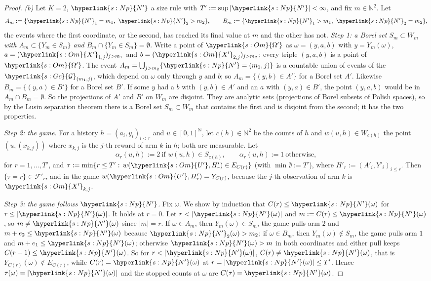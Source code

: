 \documentclass[11pt]{article}
\newcommand{\sy}[2]{\hyperlink{#1}{#2}}
\newcommand{\N}{\mathbb{N}}
\newcommand{\Gc}{\sy{s:Gc}{\mathcal{G}}}
\newcommand{\Np}{\sy{s:Np}{N'}}
\newcommand{\Om}{\sy{s:Om}{\Omega'}}
\newcommand{\Up}{\sy{s:Om}{U'}}
\newcommand{\Xp}{\sy{s:Om}{X'}}
\begin{document}
\begin{proof}
\emph{(b)} Let $K=2$, $\Np$ a size rule with $T':=\sup|\Np|<\infty$, and fix $m\in\N^2$. Let
\begin{equation*}
A_m:=\{\Np_1=m_1,\ \Np_2>m_2\},\qquad B_m:=\{\Np_1>m_1,\ \Np_2=m_2\},
\end{equation*}
the events where the first coordinate, or the second, has reached its final value at $m$ and the
other has not. \emph{Step 1: a Borel set $S_m\subset W_m$ with $A_m\subset\{Y_m\in S_m\}$ and
$B_m\cap\{Y_m\in S_m\}=\emptyset$.} Write a point of $\Om$ as $\omega=(y,a,b)$ with $y=Y_m(\omega)$,
$a=(\Xp_{1,j})_{j>m_1}$ and $b=(\Xp_{2,j})_{j>m_2}$; every triple $(y,a,b)$ is a point of $\Om$.
The event $A_m=\bigcup_{j>m_2}\{\Np=(m_1,j)\}$ is a countable union of events of the
$\Gc_{(m_1,j)}$, which depend on $\omega$ only through $y$ and $b$; so $A_m=\{(y,b)\in A'\}$ for a
Borel set $A'$. Likewise $B_m=\{(y,a)\in B'\}$ for a Borel set $B'$. If some $y$ had a $b$ with
$(y,b)\in A'$ and an $a$ with $(y,a)\in B'$, the point $(y,a,b)$ would be in $A_m\cap B_m=\emptyset$.
So the projections of $A'$ and $B'$ on $W_m$ are disjoint. They are analytic sets (projections of
Borel subsets of Polish spaces), so by the Lusin separation theorem \citep[Theorem~14.7]{K95} there
is a Borel set $S_m\subset W_m$ that contains the first and is disjoint from the second; it has the
two properties.

\emph{Step 2: the game.} For a history $h=(a_i,y_i)_{i<r}$ and $u\in[0,1]^{\N}$, let $c(h)\in\N^2$
be the counts of $h$ and $w(u,h)\in W_{c(h)}$ the point $(u,(x_{k,j}))$ where $x_{k,j}$ is the
$j$-th reward of arm $k$ in $h$; both are measurable. Let
\begin{equation*}
\alpha_r(u,h):=2\ \text{if }w(u,h)\in S_{c(h)},\qquad\alpha_r(u,h):=1\ \text{otherwise},
\end{equation*}
for $r=1,\dots,T'$, and $\tau:=\min\{r\le T':\,w(\Up,H'_r)\in E_{C(r)}\}$ (with $\min\emptyset:=T'$),
where $H'_r:=(A'_i,Y'_i)_{i\le r}$. Then $\{\tau=r\}\in\mathcal F'_r$, and in the game
$w(\Up,H'_r)=Y_{C(r)}$, because the $j$-th observation of arm $k$ is $\Xp_{k,j}$.

\emph{Step 3: the game follows $\Np$.} Fix $\omega$. We show by induction that $C(r)\le \Np(\omega)$
for $r\le|\Np(\omega)|$. It holds at $r=0$. Let $r<|\Np(\omega)|$ and $m:=C(r)\le \Np(\omega)$, so
$m\ne \Np(\omega)$ since $|m|=r$. If $\omega\in A_m$, then $Y_m(\omega)\in S_m$, the game pulls arm $2$
and $m+e_2\le \Np(\omega)$ because $\Np_2(\omega)>m_2$; if $\omega\in B_m$, then $Y_m(\omega)\notin S_m$,
the game pulls arm $1$ and $m+e_1\le \Np(\omega)$; otherwise $\Np(\omega)>m$ in both coordinates and
either pull keeps $C(r+1)\le \Np(\omega)$. So for $r<|\Np(\omega)|$, $C(r)\ne \Np(\omega)$, that is
$Y_{C(r)}(\omega)\notin E_{C(r)}$, while $C(r)=\Np(\omega)$ at $r=|\Np(\omega)|\le T'$. Hence
$\tau(\omega)=|\Np(\omega)|$ and the stopped counts at $\omega$ are $C(\tau)=\Np(\omega)$.


\end{proof}
\end{document}
